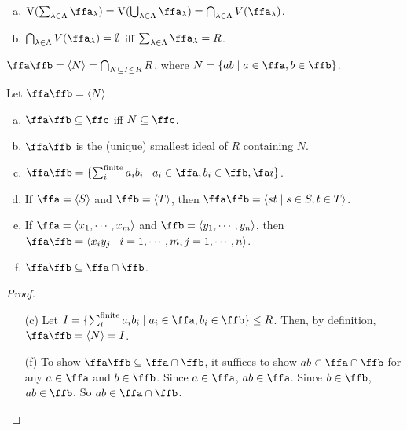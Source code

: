 \begin{fact}
    \begin{enumerate}[(a)]
        \item $\operatorname{V}(\sum_{\lambda \in \Lambda} \ffa_\lambda) = \operatorname{V}(\bigcup_{\lambda \in \Lambda} \ffa_\lambda) = \bigcap_{\lambda \in \Lambda} V(\ffa_\lambda)$.
        \item $\bigcap_{\lambda \in \Lambda}V(\ffa_\lambda) = \emptyset$ iff $\sum_{\lambda \in \Lambda} \ffa_\lambda = R$.
    \end{enumerate}
\end{fact}

\begin{definition}
    $\ffa \ffb = \langle N \rangle = \bigcap_{N \subseteq I \leq R}R$, where $N = \{ab \mid a \in \ffa,b \in \ffb\}$. 
\end{definition}

\begin{fact}
    Let $\ffa \ffb = \langle N \rangle$.
    \begin{enumerate}[(a)]
        \item $\ffa \ffb \subseteq \ffc$ iff $N \subseteq \ffc$.
        \item $\ffa \ffb$ is the (unique) smallest ideal of $R$ containing $N$.
        \item $\ffa\ffb = \{\sum_{i}^{\text{finite}}a_ib_i \mid a_i \in \ffa,b_i \in \ffb,\fa i\}$.
        \item If $\ffa = \langle S \rangle$ and $\ffb = \langle T \rangle$, then $\ffa\ffb = \langle st \mid s \in S, t \in T\rangle$.
        \item If $\ffa = \langle x_1,\cdots,x_m \rangle$ and $\ffb = \langle y_1,\cdots,y_n \rangle$, then $\ffa\ffb = \langle x_iy_j \mid i = 1,\cdots,m,j = 1,\cdots,n \rangle$.
        \item $\ffa \ffb \subseteq \ffa \cap \ffb$.
    \end{enumerate}
\end{fact}

\begin{proof}
    \begin{enumerate}
        \item [(c)]
            Let $I = \{\sum_{i}^{\text{finite}} a_ib_i \mid a_i \in \ffa,b_i \in \ffb\} \leq R$. Then, by definition, $\ffa \ffb = \langle N \rangle = I$.
        \item [(f)]
            To show $\ffa \ffb \subseteq \ffa \cap \ffb$, it suffices to show $ab \in \ffa \cap \ffb$ for any $a \in \ffa$ and $b \in \ffb$. Since $a \in \ffa$, $ab \in \ffa$. Since $b \in \ffb$, $ab \in \ffb$. So $ab \in \ffa \cap \ffb$.
    \end{enumerate}
\end{proof}

